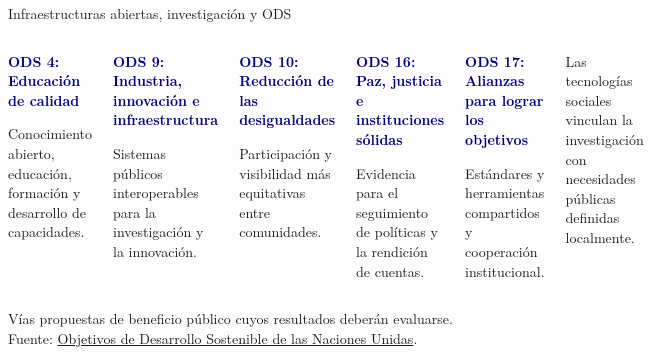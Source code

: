 \documentclass[aspectratio=169,11pt]{beamer}
\newcommand{\keypoint}[2]{%
  \begin{minipage}[t]{0.98\linewidth}
  \colorbox{Mist}{\parbox{0.92\linewidth}{\raggedright\vspace{0.08cm}\textcolor{Navy}{\bfseries #1}\par\small #2\vspace{0.08cm}}}
  \end{minipage}}
\begin{document}
\begin{frame}{Infraestructuras abiertas, investigación y ODS}
\begin{columns}[T,onlytextwidth]\keypoint{ODS 4: Educación de calidad}{Conocimiento abierto, educación, formación y desarrollo de capacidades.}\vspace{.06cm}\par\keypoint{ODS 9: Industria, innovación e infraestructura}{Sistemas públicos interoperables para la investigación y la innovación.}\vspace{.06cm}\par\keypoint{ODS 10: Reducción de las desigualdades}{Participación y visibilidad más equitativas entre comunidades.}\keypoint{ODS 16: Paz, justicia e instituciones sólidas}{Evidencia para el seguimiento de políticas y la rendición de cuentas.}\vspace{.06cm}\par\keypoint{ODS 17: Alianzas para lograr los objetivos}{Estándares y herramientas compartidos y cooperación institucional.}\vspace{.06cm}\par\small Las tecnologías sociales vinculan la investigación con necesidades públicas definidas localmente.\end{columns}
\vfill
\begin{center}\small Vías propuestas de beneficio público cuyos resultados deberán evaluarse.\\[.08cm]{\tiny Fuente: \href{https://sdgs.un.org/goals}{Objetivos de Desarrollo Sostenible de las Naciones Unidas}.}\end{center}
\end{frame}
\end{document}
